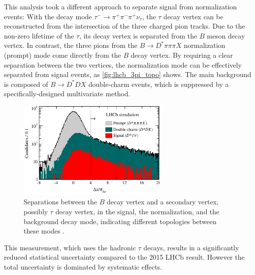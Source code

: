 This analysis took a different approach to separate signal from normalization
events:
With the decay mode $\tau^- \rightarrow \pi^+ \pi^- \pi^+ \nu_\tau$,
the $\tau$ decay vertex can be reconstructed from the intersection of the three
charged pion tracks.
Due to the non-zero lifetime of the $\tau$, its decay vertex is separated from
the $B$ meson decay vertex.
In contrast, the three pions from the $B \rightarrow D^* \pi \pi \pi X$
normalization (prompt) mode come directly from the $B$ decay vertex.
By requiring a clear separation between the two vertices, the normalization mode
can be effectively separated from signal events, as \autoref{fig:lhcb_3pi_topo}
shows.
The main background is composed of $B \rightarrow D^* D X$ double-charm events,
which is suppressed by a specifically-designed multivariate method.

\begin{figure}[ht]
    \centering
    \includegraphics[width=0.65\textwidth]{figs/lhcb_3pi_topo.pdf}
    \caption{
        Separations between the $B$ decay vertex and a secondary vertex, possibly
        $\tau$ decay vertex, in the signal, the normalization, and the
        background decay mode, indicating different topologies between these
        modes \cite{Aaij:2017deq}.
    }
    \label{fig:lhcb_3pi_topo}
\end{figure}

This measurement, which uses the hadronic $\tau$ decays, results in a
significantly reduced statistical uncertainty compared to the 2015 LHCb result.
However the total uncertainty is dominated by systematic effects.
